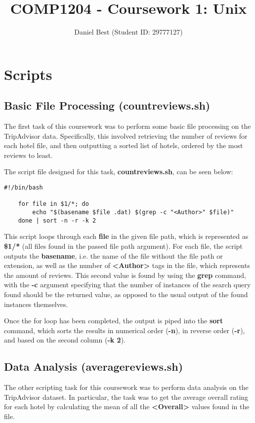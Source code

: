 \documentclass{article}
\title{COMP1204 - Coursework 1: Unix}
\author{Daniel Best (Student ID: 29777127)}
\begin{document}
	
	\maketitle
	
	\newpage
	\section{Scripts}
	
	\subsection{Basic File Processing (countreviews.sh)}
	The first task of this coursework was to perform some basic file processing on the TripAdvisor data. Specifically, this involved retrieving the number of reviews for each hotel file, and then outputting a sorted list of hotels, ordered by the most reviews to least. \newline
	
	\noindent
	The script file designed for this task, \textbf{countreviews.sh}, can be seen below:
	
	\begin{lstlisting}[caption={countreviews.sh}, captionpos=b]
	#!/bin/bash
	
	for file in $1/*; do	
		echo "$(basename $file .dat) $(grep -c "<Author>" $file)"
	done | sort -n -r -k 2
	\end{lstlisting}

	\noindent
	This script loops through each \textbf{file} in the given file path, which is represented as \textbf{\$1/*} (all files found in the passed file path argument). For each file, the script outputs the \textbf{basename}, i.e. the name of the file without the file path or extension, as well as the number of \textbf{{\textless}Author\textgreater} tags in the file, which represents the amount of reviews. This second value is found by using the \textbf{grep} command, with the \textbf{-c} argument specifying that the number of instances of the search query found should be the returned value, as opposed to the usual output of the found instances themselves. \newline
	
	\noindent
	Once the for loop has been completed, the output is piped into the \textbf{sort} command, which sorts the results in numerical order (\textbf{-n}), in reverse order (\textbf{-r}), and based on the second column (\textbf{-k 2}).
	
	\newpage
	\subsection{Data Analysis (averagereviews.sh)}
	The other scripting task for this coursework was to perform data analysis on the TripAdvisor dataset. In particular, the task was to get the average overall rating for each hotel by calculating the mean of all the \textbf{{\textless}Overall\textgreater} values found in the file. \newline
	
\end{document}
